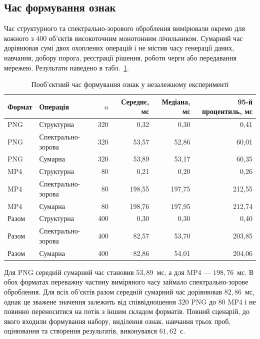 \subsection{Час формування ознак}
\label{subsec:ch4_ind_svs_timing}

Час структурного та спектрально-зорового оброблення вимірювали окремо для кожного з $400$ об'єктів високоточним монотонним лічильником. Сумарний час дорівнював сумі двох охоплених операцій і не містив часу генерації даних, навчання, добору порога, реєстрації рішення, роботи черги або передавання мережею. Результати наведено в табл.~\ref{tab:ch4_ind_svs_timing}.

\begin{table}[htbp]
\caption{Пооб'єктний час формування ознак у незалежному експерименті}
\label{tab:ch4_ind_svs_timing}
\centering
\small
\begin{tabular}{llrrrr}
\toprule
Формат & Операція & $n$ & Середнє, мс & Медіана, мс & 95-й процентиль, мс \\
\midrule
PNG & Структурна & 320 & 0,32 & 0,30 & 0,41 \\
PNG & Спектрально-зорова & 320 & 53,57 & 52,86 & 60,01 \\
PNG & Сумарна & 320 & 53,89 & 53,17 & 60,35 \\
\midrule
MP4 & Структурна & 80 & 0,21 & 0,20 & 0,26 \\
MP4 & Спектрально-зорова & 80 & 198,55 & 197,75 & 212,55 \\
MP4 & Сумарна & 80 & 198,76 & 197,95 & 212,74 \\
\midrule
Разом & Структурна & 400 & 0,30 & 0,30 & 0,40 \\
Разом & Спектрально-зорова & 400 & 82,57 & 53,70 & 203,85 \\
Разом & Сумарна & 400 & 82,86 & 54,01 & 204,06 \\
\bottomrule
\end{tabular}
\end{table}

Для PNG середній сумарний час становив $53{,}89$~мс, а для MP4 --- $198{,}76$~мс. В обох форматах переважну частину виміряного часу займало спектрально-зорове оброблення. Для всіх об'єктів разом середній сумарний час дорівнював $82{,}86$~мс, однак це зважене значення залежить від співвідношення $320$ PNG до $80$ MP4 і не повинно переноситися на потік з іншим складом форматів. Повний сценарій, до якого входили формування набору, виділення ознак, навчання трьох проб, оцінювання та створення результатів, виконувався $61{,}62$~с.

